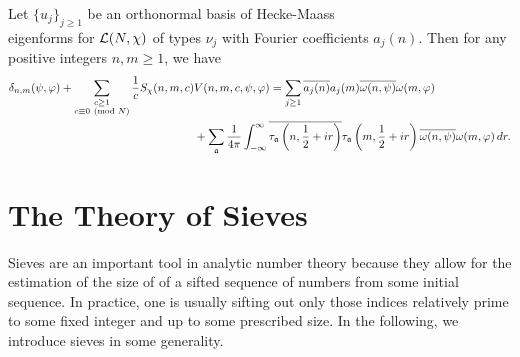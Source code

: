 \documentclass[12pt,oneside]{book}
\begin{document}
    \begin{theorem}
      Let $\{u_{j}\}_{j \ge 1}$ be an orthonormal basis of Hecke-Maass \\ eigenforms for $\mathcal{L}(N,\chi)$ of types $\nu_{j}$ with Fourier coefficients $a_{j}(n)$. Then for any positive integers $n,m \ge 1$, we have
      \begin{align*}
        \delta_{n,m}(\psi,\varphi)+\sum_{\substack{c \ge 1 \\ c \equiv 0 \ \left(\text{mod }N\right)}}\frac{1}{c}S_{\chi}(n,m,c)&V(n,m,c,\psi,\varphi) = \sum_{j \ge 1}\overline{a_{j}(n)}a_{j}(m)\overline{\omega(n,\psi)}\omega(m,\varphi) \\
        &+\sum_{\mathfrak{a}}\frac{1}{4\pi}\int_{-\infty}^{\infty}\overline{\tau_{\mathfrak{a}}\left(n,\frac{1}{2}+ir\right)}\tau_{\mathfrak{a}}\left(m,\frac{1}{2}+ir\right)\overline{\omega(n,\psi)}\omega(m,\varphi)\,dr.
      \end{align*}
    \end{theorem}

\chapter{The Theory of Sieves}
  Sieves are an important tool in analytic number theory because they allow for the estimation of the size of of a sifted sequence of numbers from some initial sequence. In practice, one is usually sifting out only those indices relatively prime to some fixed integer and up to some prescribed size. In the following, we introduce sieves in some generality.
\end{document}
